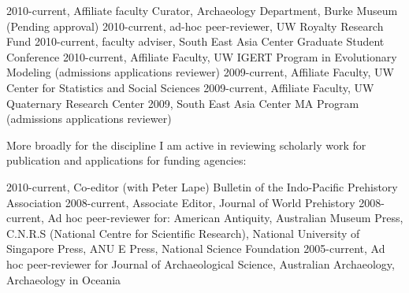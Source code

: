\documentclass[11pt,article,oneside]{memoir}
\begin{document}
2010-current, Affiliate faculty Curator, Archaeology Department, Burke Museum (Pending approval)
2010-current, ad-hoc peer-reviewer, UW Royalty Research Fund
2010-current, faculty adviser, South East Asia Center Graduate Student Conference
2010-current, Affiliate Faculty, UW IGERT Program in Evolutionary Modeling (admissions applications reviewer)
2009-current, Affiliate Faculty, UW Center for Statistics and Social Sciences
2009-current, Affiliate Faculty, UW Quaternary Research Center
2009, South East Asia Center MA Program (admissions applications reviewer)

More broadly for the discipline I am active in reviewing scholarly work for publication and applications for funding agencies:

2010-current, Co-editor (with Peter Lape) Bulletin of the Indo-Pacific Prehistory Association
2008-current, Associate Editor, Journal of World Prehistory
2008-current, Ad hoc peer-reviewer for: American Antiquity, Australian Museum Press, C.N.R.S (National Centre for Scientific Research), National University of Singapore Press, ANU E Press, National Science Foundation
2005-current, Ad hoc peer-reviewer for Journal of Archaeological Science, Australian Archaeology, Archaeology in Oceania
\end{document}
